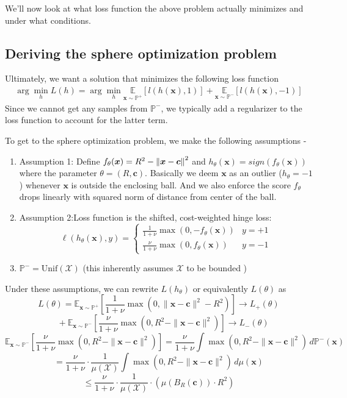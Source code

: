 \documentclass[11pt]{report}
\begin{document}
We'll now look at what loss function the above problem actually minimizes and under what conditions. 

\subsection{Deriving the sphere optimization problem}
Ultimately, we want a solution that minimizes the following loss function
\begin{align}
    \arg\!\min_h L(h) 
    = \arg\!\min_h \mathbb{E}\limits_{\boldsymbol{x} \sim \mathbb{P}^+} \left[ l(h(\boldsymbol{x}), 1) \right] + \mathbb{E}\limits_{\boldsymbol{x} \sim \mathbb{P}^-} \left[ l(h(\boldsymbol{x}), -1) \right]
\end{align}
Since we cannot get any samples from $\mathbb{P^-}$, we typically add a regularizer to the loss function to account for the latter term.

To get to the sphere optimization problem, we make the following assumptions - 
\begin{enumerate}
    \item Assumption 1: Define $f_\theta(\boldsymbol{x}) = R^2 - \left\lVert \boldsymbol{x} - \boldsymbol{c} \right\rVert^2$ and $h_\theta(\boldsymbol{x}) = sign(f_\theta(\boldsymbol{x}))$ where the parameter $\theta = (R, \boldsymbol{c})$.  Basically we deem $\boldsymbol{x}$ as an outlier ($h_\theta = -1$) whenever $\boldsymbol{x}$ is outside the enclosing ball. And we also enforce the score $f_\theta$ drops linearly with squared norm of distance from center of the ball. 
    \item Assumption 2:Loss function is the shifted, cost-weighted hinge loss:
        \[
        \ell(h_\theta(\boldsymbol{x}), y) = 
        \begin{cases}
        \frac{1}{1 + \nu} \max(0, -f_\theta(\boldsymbol{x})) & y = +1 \\
        \frac{\nu}{1 + \nu} \max(0, f_\theta(\boldsymbol{x})) & y = -1
        \end{cases}
        \]
    \item $\mathbb{P}^- = \text{Unif}(\mathcal{X})$ (this inherently assumes $\mathcal{X}$ to be bounded )
\end{enumerate}
Under these assumptions, we can rewrite $L(h_\theta)$ or equivalently $L(\theta)$ as 
\[
L(\theta) = \mathbb{E}_{\boldsymbol{x} \sim \mathbb{P}^+} \left[ \frac{1}{1 + \nu} \max\left(0, \|\boldsymbol{x} - \boldsymbol{c}\|^2 - R^2\right) \right] 
\rightarrow L_+(\theta)
\]
\[
\quad + \mathbb{E}_{\boldsymbol{x} \sim \mathbb{P}^-} \left[ \frac{\nu}{1 + \nu} \max\left(0, R^2 - \|\boldsymbol{x} - \boldsymbol{c}\|^2 \right) \right] 
\rightarrow L_-(\theta)
\]
\[
\mathbb{E}_{\boldsymbol{x} \sim \mathbb{P}^-} \left[ \frac{\nu}{1+\nu} \max(0, R^2 - \|\boldsymbol{x} - \boldsymbol{c}\|^2) \right]
= \frac{\nu}{1+\nu} \int \max(0, R^2 - \|\boldsymbol{x} - \boldsymbol{c}\|^2) \, d\mathbb{P}^-(\boldsymbol{x})
\]
\[
= \frac{\nu}{1+\nu} \cdot \frac{1}{\mu(\mathcal{X})} \int \max(0, R^2 - \|\boldsymbol{x} - \boldsymbol{c}\|^2) \, d\mu(\boldsymbol{x})
\]
\[
\leq \frac{\nu}{1+\nu} \cdot \frac{1}{\mu(\mathcal{X})} \cdot \left( \mu(B_R(\boldsymbol{c})) \cdot R^2 \right)
\]
\end{document}
